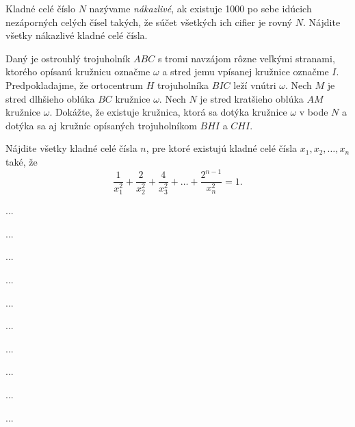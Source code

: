 {%
Kladné celé číslo $N$ nazývame {\it nákazlivé}, ak existuje 1000 po sebe idúcich nezáporných celých
čísel takých, že súčet všetkých ich cifier je rovný $N$. Nájdite všetky nákazlivé kladné celé čísla.}

{%
Daný je ostrouhlý trojuholník $ABC$ s tromi navzájom rôzne veľkými stranami, ktorého opísanú
kružnicu označme $\omega$ a stred jemu vpísanej kružnice označme $I$. Predpokladajme, že ortocentrum $H$ trojuholníka $BIC$ leží vnútri $\omega$. Nech $M$ je stred dlhšieho oblúka $BC$ kružnice $\omega$. Nech $N$ je stred kratšieho oblúka $AM$ kružnice $\omega$. Dokážte, že existuje kružnica, ktorá sa dotýka kružnice $\omega$ v bode $N$ a dotýka sa aj kružníc opísaných trojuholníkom $BHI$ a $CHI$.
}

{%
Nájdite všetky kladné celé čísla $n$, pre ktoré existujú kladné celé čísla $x_1,x_2,\dots,x_n$ také, že
$$
\frac1{x_1^2} + \frac2{x_2^2} + \frac4{x_3^2} + \dots + \frac{2^{n-1}}{x_n^2} = 1.
$$}

{%
}
\podpis{}

{%
}
\podpis{}

{%
}
\podpis{}

{%
}
\podpis{}

{%
}
\podpis{}

{%
}
\podpis{}

{%
}
\podpis{}

{%
}
\podpis{}

{%
...}

{%
...}

{%
...}

{%
...}

{%
...}

{%
...}

{%
...}

{%
...}

{%
...}

{%
...}

